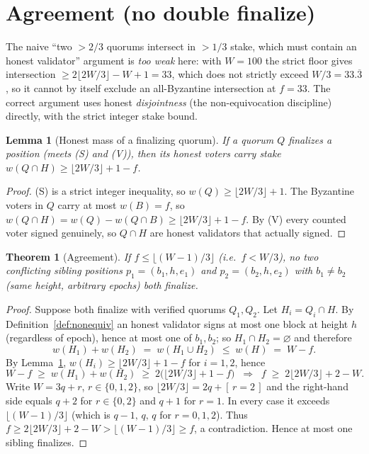 \documentclass[11pt]{article}
\newtheorem{theorem}{Theorem}
\newtheorem{lemma}{Lemma}
\begin{document}
\section{Agreement (no double finalize)}

The naive ``two $>\!2/3$ quorums intersect in $>\!1/3$ stake, which must contain an
honest validator'' argument is \emph{too weak} here: with $W=100$ the strict floor
gives intersection $\ge 2\lfloor 2W/3\rfloor - W + 1 = 33$, which does not strictly
exceed $W/3=33.\overline{3}$, so it cannot by itself exclude an all-Byzantine
intersection at $f=33$. The correct argument uses honest \emph{disjointness} (the
non-equivocation discipline) directly, with the strict integer stake bound.

\begin{lemma}[Honest mass of a finalizing quorum]\label{lem:mass}
If a quorum $Q$ finalizes a position (meets (S) and (V)), then its honest voters
carry stake $w(Q\cap H) \ge \lfloor 2W/3\rfloor + 1 - f$.
\end{lemma}
\begin{proof}
(S) is a strict integer inequality, so $w(Q)\ge \lfloor 2W/3\rfloor + 1$. The
Byzantine voters in $Q$ carry at most $w(B)=f$, so
$w(Q\cap H)=w(Q)-w(Q\cap B)\ge \lfloor 2W/3\rfloor + 1 - f$. By (V) every counted
voter signed genuinely, so $Q\cap H$ are honest validators that actually signed.
\end{proof}

\begin{theorem}[Agreement]\label{thm:agree}
If $f\le\lfloor (W-1)/3\rfloor$ (i.e.\ $f<W/3$), no two conflicting sibling positions
$p_1=(b_1,h,e_1)$ and $p_2=(b_2,h,e_2)$ with $b_1\neq b_2$ (same height, arbitrary
epochs) both finalize.
\end{theorem}
\begin{proof}
Suppose both finalize with verified quorums $Q_1,Q_2$. Let $H_i=Q_i\cap H$. By
Definition~\ref{def:nonequiv} an honest validator signs at most one block at height $h$
(regardless of epoch), hence at most one of $b_1,b_2$; so $H_1\cap H_2=\varnothing$ and
therefore
\[
  w(H_1)+w(H_2)\;=\;w(H_1\cup H_2)\;\le\;w(H)\;=\;W-f .
\]
By Lemma~\ref{lem:mass}, $w(H_i)\ge \lfloor 2W/3\rfloor + 1 - f$ for $i=1,2$, hence
\[
  W-f \;\ge\; w(H_1)+w(H_2) \;\ge\; 2\big(\lfloor 2W/3\rfloor + 1 - f\big)
  \;\;\Longrightarrow\;\; f \;\ge\; 2\lfloor 2W/3\rfloor + 2 - W .
\]
Write $W=3q+r$, $r\in\{0,1,2\}$, so $\lfloor 2W/3\rfloor = 2q+[\,r{=}2\,]$ and the
right-hand side equals $q+2$ for $r\in\{0,2\}$ and $q+1$ for $r=1$. In every case it
exceeds $\lfloor (W-1)/3\rfloor$ (which is $q-1,\,q,\,q$ for $r=0,1,2$). Thus
$f\ge 2\lfloor 2W/3\rfloor+2-W > \lfloor (W-1)/3\rfloor \ge f$, a contradiction.
Hence at most one sibling finalizes.
\end{proof}
\end{document}
